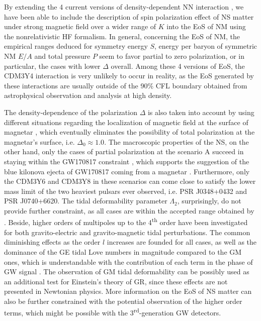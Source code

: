 By extending the 4 current versions of density-dependent \gls{NN} interaction \citep{tan2021equation}, we have been able to include the description of spin polarization effect of \gls{NS} matter under strong magnetic field over a wider range of $K$ into the \gls{EoS} of \gls{NM} using the nonrelativistic \gls{HF} formalism. In general, concerning the \gls{EoS} of \gls{NM}, the empirical ranges deduced for symmetry energy $S$, energy per baryon of symmetric \gls{NM} $E/A$ and total pressure $P$ seem to favor partial to zero polarization, or in particular, the cases with lower $\Delta$ overall. Among these 4 versions of \gls{EoS}, the CDM3Y4 interaction is very unlikely to occur in reality, as the \gls{EoS} generated by these interactions are usually outside of the 90\% \gls{CFL} boundary obtained from astrophysical observation and analysis at high density.

The density-dependence of the polarization $\Delta$ is also taken into account by using different situations regarding the localization of magnetic field at the surface of magnetar \citep{tan2020spin}, which eventually eliminates the possibility of total polarization at the magnetar's surface, i.e. $\Delta_0\approx 1.0$. The macroscopic properties of the \gls{NS}, on the other hand, only the cases of partial polarization at the scenario A succeed in staying within the GW170817 constraint \citep{abbott2018gw170817}, which supports the suggestion of the blue kilonova ejecta of GW170817 coming from a magnetar \citep{metzger2018magnetar,tan2020spin}. Furthermore, only the CDM3Y6 and CDM3Y8 in these scenarios can come close to satisfy the lower mass limit of the two heaviest pulsars ever observed, i.e. \gls{PSR} J0348+0432 and \gls{PSR} J0740+6620. The tidal deformability parameter $\Lambda_2$, surprisingly, do not provide further constraint, as all cases are within the accepted range obtained by \cite{abbott2018gw170817}. Beside, higher orders of multipoles up to the 4\textsuperscript{th} order have been investigated for both gravito-electric and gravito-magnetic tidal perturbations. The common diminishing effects as the order $l$ increases are founded for all cases, as well as the dominance of the \gls{GE} tidal Love numbers in magnitude compared to the \gls{GM} ones, which is understandable with the contribution of each term in the phase of \gls{GW} signal \citep{abdelsalhin2018post}. The observation of \gls{GM} tidal deformability can be possibly used as an additional test for Einstein's theory of \gls{GR}, since these effects are not presented in Newtonian physics. More information on the \gls{EoS} of \gls{NS} matter can also be further constrained with the potential observation of the higher order terms, which might be possible with the 3\textsuperscript{rd}-generation \gls{GW} detectors.
